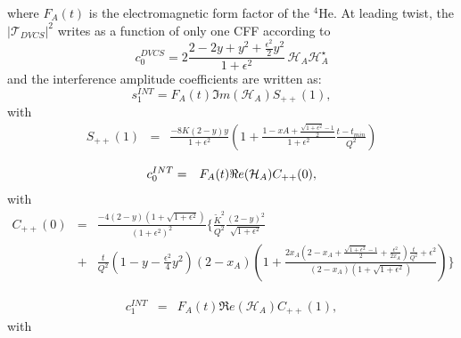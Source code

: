 \normalsize
where $F_A(t)$ is the electromagnetic form factor of the $^4$He. At leading twist, the $|\mathcal{T}_{DVCS}|^{2}$ writes as a function of only one CFF according to
\small
\begin{equation}
   c_0^{DVCS}= 2 \frac{2-2y+y^2 + \frac{\epsilon^2}{2}y^2}{1 + \epsilon^2} \, 
   {\mathcal H}_A {\mathcal H}^{\star}_A 
   \label{eq:c0DVCS}
\end{equation}
\normalsize
and the interference amplitude coefficients are written as:
\small
\begin{equation}
s_{1}^{INT} = F_{A}(t) \Im m(\mathcal{H}_{A}) S_{++}(1),
\end{equation}
with
\begin{eqnarray}
   S_{++}(1) &=& \frac{-8K(2-y)y}{1+\epsilon^2} \left( 1 + 
\frac{1-xA+\frac{\sqrt{1+\epsilon^2}-1}{2}}{1+\epsilon^2} 
\frac{t-t_{min}}{Q^{2}} \right) \label{eq:s1I}
\end{eqnarray}



\begin{eqnarray}
\small
c_0^{INT} &=& F_A(t) \Re e(\mathcal{H}_{A}) C_{++}(0),
\end{eqnarray}
with \begin{eqnarray}  C_{++}(0) &=&
\frac{-4(2-y)(1+\sqrt{1+\epsilon^{2}})}{(1+\epsilon^{2})^2}  \bigg\{ 
   \frac{\widetilde{K}^2}{Q^2}  \frac{(2-y)^2}{\sqrt{1+\epsilon^{2}}} \, \\
   &+& \frac{t}{Q^2}  \left( 1 - y - \frac{\epsilon^2}{4} y^2 \right)  
(2-x_{A}) \left(  1 + \frac{2x_A(2-x_A + \frac{\sqrt{1+\epsilon^{2}}-1}{2} + 
\frac{\epsilon^{2}}{2x_A})\frac{t}{Q^2} + \epsilon^{2}}{(2-x_A) 
(1+\sqrt{1+\epsilon^{2}})}  \right)  \bigg\} \nonumber
 \label{eq:c0I} 
 \end{eqnarray}

\begin{eqnarray}
   c_1^{INT} &=&  F_A(t) \Re e(\mathcal{H}_{A}) C_{++}(1),
\end{eqnarray}
with  
   
